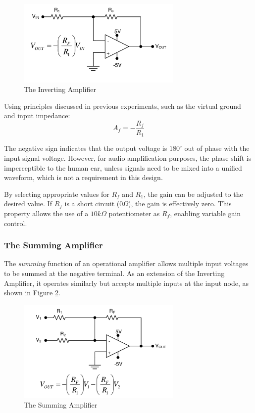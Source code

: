 \documentclass[12pt]{article}
\begin{document}
\begin{figure}[H] \centering \includegraphics[width=8cm]{dp_02} \caption{The
		Inverting Amplifier} \label{fig:invertingamp} \end{figure}

Using principles discussed in previous experiments, such as the virtual ground
and input impedance: \begin{equation} A_f = - \frac{R_f}{R_1} \end{equation}

The negative sign indicates that the output voltage is $180^\circ$ out of phase
with the input signal voltage. However, for audio amplification purposes, the
phase shift is imperceptible to the human ear, unless signals need to be mixed
into a unified waveform, which is not a requirement in this design.

By selecting appropriate values for $R_f$ and $R_1$, the gain can be adjusted to
the desired value. If $R_f$ is a short circuit (0$\Omega$), the gain is
effectively zero. This property allows the use of a $10k\Omega$ potentiometer as
$R_f$, enabling variable gain control.

\subsubsection{The Summing Amplifier}

The \textit{summing} function of an operational amplifier allows multiple input
voltages to be summed at the negative terminal. As an extension of the Inverting
Amplifier, it operates similarly but accepts multiple inputs at the input node,
as shown in Figure \ref{fig:summingamp}.

\begin{figure}[H] \centering \includegraphics[width=8cm]{dp_01} \caption{The
		Summing Amplifier} \label{fig:summingamp} \end{figure}
\end{document}
